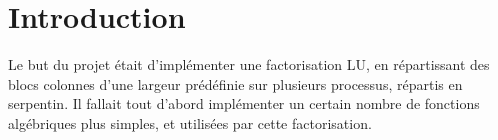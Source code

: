 \section{Introduction} %
\label{sec:introduction}
Le but du projet était d'implémenter une factorisation LU, en répartissant des blocs colonnes d'une largeur prédéfinie sur plusieurs processus, répartis en serpentin. Il fallait tout d'abord implémenter un certain nombre de fonctions algébriques plus simples, et utilisées par cette factorisation.


